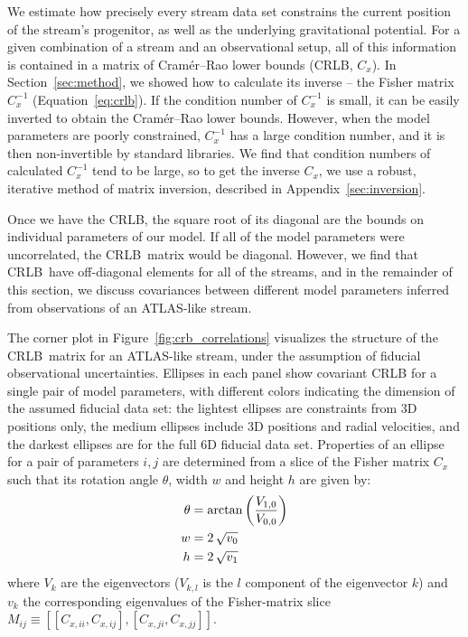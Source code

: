 \documentclass[modern]{aastex62}
\newcommand{\acronym}[1]{{\small{#1}}}
\newcommand{\CRLB}{\acronym{CRLB}}
\begin{document}
We estimate how precisely every stream data set constrains the current position of the stream's progenitor, as well as the underlying gravitational potential.
For a given combination of a stream and an observational setup, all of this information is contained in a matrix of Cram\'er--Rao lower bounds (\CRLB, $C_x$).
In Section~\ref{sec:method}, we showed how to calculate its inverse -- the Fisher matrix $C_x^{-1}$ (Equation~\ref{eq:crlb}).
If the condition number of $C_x^{-1}$ is small, it can be easily inverted to obtain the Cram\'er--Rao lower bounds.
However, when the model parameters are poorly constrained, $C_x^{-1}$ has a large condition number, and it is then non-invertible by standard libraries.
We find that condition numbers of calculated $C_x^{-1}$ tend to be large, so to get the inverse $C_x$, we use a robust, iterative method of matrix inversion, described in Appendix~\ref{sec:inversion}.

Once we have the \CRLB, the square root of its diagonal are the bounds on individual parameters of our model.
If all of the model parameters were uncorrelated, the \CRLB\ matrix would be diagonal.
However, we find that \CRLB\ have off-diagonal elements for all of the streams, and in the remainder of this section, we discuss covariances between different model parameters inferred from observations of an ATLAS-like stream.

The corner plot in Figure~\ref{fig:crb_correlations} visualizes the structure of the \CRLB\ matrix for an ATLAS-like stream, under the assumption of fiducial observational uncertainties.
Ellipses in each panel show covariant CRLB for a single pair of model parameters, with different colors indicating the dimension of the assumed fiducial data set: the lightest ellipses are constraints from 3D positions only, the medium ellipses include 3D positions and radial velocities, and the darkest ellipses are for the full 6D fiducial data set.
Properties of an ellipse for a pair of parameters $i,j$ are determined from a slice of the Fisher matrix $C_x$ such that its rotation angle $\theta$, width $w$ and height $h$ are given by:
\begin{align*}
\theta &= {\rm arc tan}\left(\frac{V_{1,0}}{V_{0,0}}\right) \\
w &= 2\,\sqrt{v_0} \\
h &= 2\,\sqrt{v_1}
\end{align*}
where $V_k$ are the eigenvectors ($V_{k,l}$ is the $l$ component of the eigenvector $k$) and $v_k$ the corresponding eigenvalues of the Fisher-matrix slice $M_{ij} \equiv \left[\left[C_{x,ii}, C_{x,ij}\right], \left[C_{x,ji}, C_{x,jj}\right]\right]$.
\end{document}

